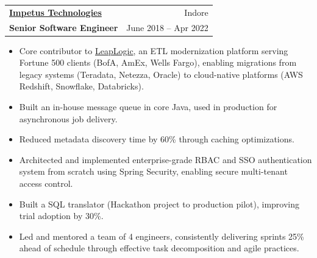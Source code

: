 \documentclass[letterpaper,11pt]{article}
\makeatletter
\newif\ifshortresume
\newcommand{\resumeItem}[1]{
  \item\small{
    {#1 \vspace{-2pt}}
  }
}
\newcommand{\resumeSubheading}[4]{
  \vspace{-2pt}\item
    \begin{tabular*}{0.97\textwidth}[t]{l@{\extracolsep{\fill}}r}
      \textbf{#1} & #2 \\
      \textbf{\small#3} & \textnormal{\small #4} \\
    \end{tabular*}\vspace{-7pt}
}
\newcommand{\resumeItemListStart}{\begin{itemize}}
\newcommand{\resumeItemListEnd}{\end{itemize}\vspace{-5pt}}
\makeatother
\begin{document}
{    \resumeSubheading
      {\href{https://www.impetus.com/}{Impetus Technologies}}{Indore}
      {Senior Software Engineer}{June 2018 -- Apr 2022}
      \resumeItemListStart
      \resumeItem{Core contributor to \href{https://www.leaplogic.io/}{LeapLogic}, an ETL modernization platform serving Fortune 500 clients (BofA, AmEx, Wells Fargo), enabling migrations from legacy systems (Teradata, Netezza, Oracle) to cloud-native platforms (AWS Redshift, Snowflake, Databricks).}
      \resumeItem{Built an in-house message queue in core Java, used in production for asynchronous job delivery.}
      \ifshortresume\else
      \resumeItem{Reduced metadata discovery time by 60\% through caching optimizations.}
      \fi
      \resumeItem{Architected and implemented enterprise-grade RBAC and SSO authentication system from scratch using Spring Security, enabling secure multi-tenant access control.}
      \resumeItem{Built a SQL translator (Hackathon project to production pilot), improving trial adoption by 30\%.}
      \ifshortresume\else
      \resumeItem{Led and mentored a team of 4 engineers, consistently delivering sprints 25\% ahead of schedule through effective task decomposition and agile practices.}
      \fi
    \resumeItemListEnd

}
\end{document}
